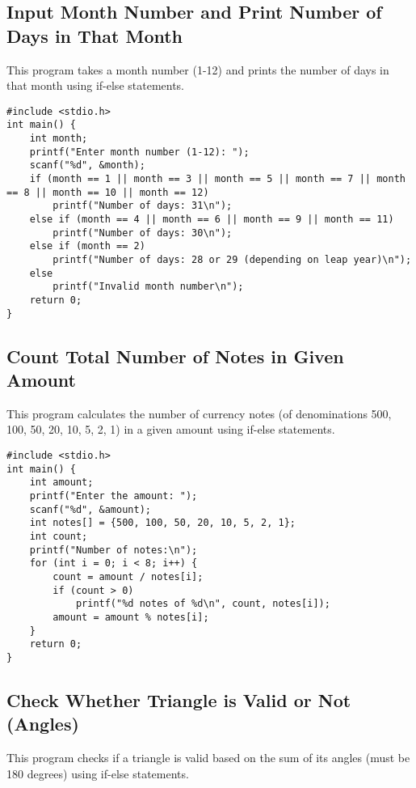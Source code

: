 \documentclass[a4paper,12pt]{article}
\begin{document}
\newpage

\subsection{Input Month Number and Print Number of Days in That Month}
This program takes a month number (1-12) and prints the number of days in that month using if-else statements.

\begin{lstlisting}[caption={Input Month Number and Print Number of Days in That Month}]
#include <stdio.h>
int main() {
    int month;
    printf("Enter month number (1-12): ");
    scanf("%d", &month);
    if (month == 1 || month == 3 || month == 5 || month == 7 || month == 8 || month == 10 || month == 12)
        printf("Number of days: 31\n");
    else if (month == 4 || month == 6 || month == 9 || month == 11)
        printf("Number of days: 30\n");
    else if (month == 2)
        printf("Number of days: 28 or 29 (depending on leap year)\n");
    else
        printf("Invalid month number\n");
    return 0;
}
\end{lstlisting}

\newpage

\subsection{Count Total Number of Notes in Given Amount}
This program calculates the number of currency notes (of denominations 500, 100, 50, 20, 10, 5, 2, 1) in a given amount using if-else statements.

\begin{lstlisting}[caption={Count Total Number of Notes in Given Amount}]
#include <stdio.h>
int main() {
    int amount;
    printf("Enter the amount: ");
    scanf("%d", &amount);
    int notes[] = {500, 100, 50, 20, 10, 5, 2, 1};
    int count;
    printf("Number of notes:\n");
    for (int i = 0; i < 8; i++) {
        count = amount / notes[i];
        if (count > 0)
            printf("%d notes of %d\n", count, notes[i]);
        amount = amount % notes[i];
    }
    return 0;
}
\end{lstlisting}

\newpage

\subsection{Check Whether Triangle is Valid or Not (Angles)}
This program checks if a triangle is valid based on the sum of its angles (must be 180 degrees) using if-else statements.
\end{document}
